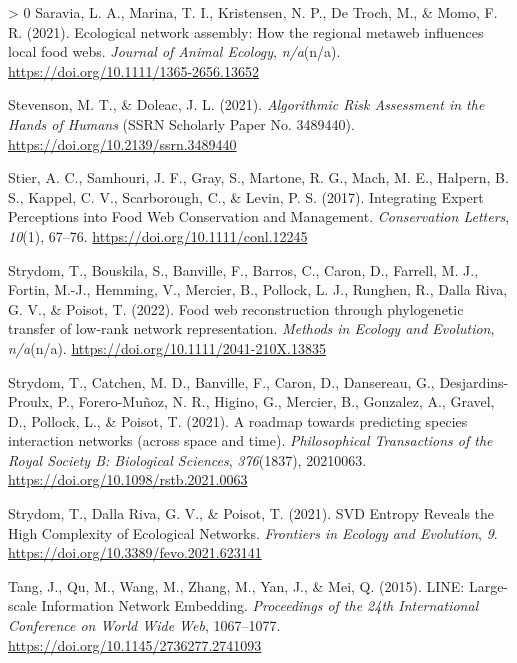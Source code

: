 \documentclass[10pt,oneside]{article}
\newlength{\cslhangindent}
\newenvironment{CSLReferences}[3] %
 {%
  \setlength{\parindent}{0pt}
  \ifodd #1 \everypar{\setlength{\hangindent}{\cslhangindent}}\ignorespaces\fi
  \ifnum #2 > 0
  \setlength{\parskip}{#2\baselineskip}
  \fi
 }%
 {}
\begin{document}
\begin{CSLReferences}{1}{0}
\leavevmode\hypertarget{ref-Saravia2021EcoNet}{}%
Saravia, L. A., Marina, T. I., Kristensen, N. P., De Troch, M., \& Momo,
F. R. (2021). Ecological network assembly: How the regional metaweb
influences local food webs. \emph{Journal of Animal Ecology},
\emph{n/a}(n/a). \url{https://doi.org/10.1111/1365-2656.13652}

\leavevmode\hypertarget{ref-Stevenson2021AlgRis}{}%
Stevenson, M. T., \& Doleac, J. L. (2021). \emph{Algorithmic Risk
Assessment in the Hands of Humans} (SSRN Scholarly Paper No. 3489440).
\url{https://doi.org/10.2139/ssrn.3489440}

\leavevmode\hypertarget{ref-Stier2017IntExp}{}%
Stier, A. C., Samhouri, J. F., Gray, S., Martone, R. G., Mach, M. E.,
Halpern, B. S., Kappel, C. V., Scarborough, C., \& Levin, P. S. (2017).
Integrating Expert Perceptions into Food Web Conservation and
Management. \emph{Conservation Letters}, \emph{10}(1), 67--76.
\url{https://doi.org/10.1111/conl.12245}

\leavevmode\hypertarget{ref-Strydom2022FooWeb}{}%
Strydom, T., Bouskila, S., Banville, F., Barros, C., Caron, D., Farrell,
M. J., Fortin, M.-J., Hemming, V., Mercier, B., Pollock, L. J., Runghen,
R., Dalla Riva, G. V., \& Poisot, T. (2022). Food web reconstruction
through phylogenetic transfer of low-rank network representation.
\emph{Methods in Ecology and Evolution}, \emph{n/a}(n/a).
\url{https://doi.org/10.1111/2041-210X.13835}

\leavevmode\hypertarget{ref-Strydom2021RoaPre}{}%
Strydom, T., Catchen, M. D., Banville, F., Caron, D., Dansereau, G.,
Desjardins-Proulx, P., Forero-Muñoz, N. R., Higino, G., Mercier, B.,
Gonzalez, A., Gravel, D., Pollock, L., \& Poisot, T. (2021). A roadmap
towards predicting species interaction networks (across space and time).
\emph{Philosophical Transactions of the Royal Society B: Biological
Sciences}, \emph{376}(1837), 20210063.
\url{https://doi.org/10.1098/rstb.2021.0063}

\leavevmode\hypertarget{ref-Strydom2021SvdEnt}{}%
Strydom, T., Dalla Riva, G. V., \& Poisot, T. (2021). SVD Entropy
Reveals the High Complexity of Ecological Networks. \emph{Frontiers in
Ecology and Evolution}, \emph{9}.
\url{https://doi.org/10.3389/fevo.2021.623141}

\leavevmode\hypertarget{ref-Tang2015LinLar}{}%
Tang, J., Qu, M., Wang, M., Zhang, M., Yan, J., \& Mei, Q. (2015). LINE:
Large-scale Information Network Embedding. \emph{Proceedings of the 24th
International Conference on World Wide Web}, 1067--1077.
\url{https://doi.org/10.1145/2736277.2741093}


\end{CSLReferences}
\end{document}
